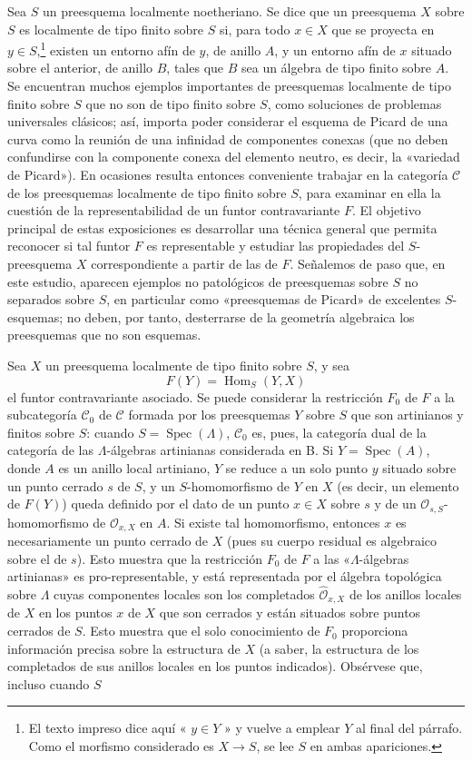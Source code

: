 \documentclass[11pt,twoside,openany]{book}
\numberwithin{equation}{section}
\newcommand{\src}[1]{%
  \phantomsection\hypertarget{src:#1}{}%
  \marginpar{\raggedleft\footnotesize\sffamily #1}%
}
\theoremstyle{plain}
\theoremstyle{definition}
\theoremstyle{remark}
\newcommand{\FgaUnitKey}{frontmatter}
\renewcommand{\src}[1]{%
  \phantomsection\hypertarget{src:\FgaUnitKey:#1}{}%
  \marginpar{\raggedleft\footnotesize\sffamily #1}%
}
\theoremstyle{plain}
\theoremstyle{definition}
\theoremstyle{remark}
\begin{document}
Sea $S$ un preesquema localmente noetheriano. Se dice que un preesquema $X$
sobre $S$ es \src{379}localmente de tipo finito sobre $S$ si, para todo
$x\in X$ que se proyecta en $y\in S$,\footnote{El texto impreso dice aquí
« $y\in Y$ » y vuelve a emplear $Y$ al final del párrafo. Como el morfismo
considerado es $X\longrightarrow S$, se lee $S$ en ambas apariciones.} existen
un entorno afín de $y$, de anillo $A$, y un entorno afín de $x$ situado sobre
el anterior, de anillo $B$, tales que $B$ sea un álgebra de tipo finito sobre
$A$. Se encuentran muchos ejemplos importantes de preesquemas localmente de
tipo finito sobre $S$ que no son de tipo finito sobre $S$, como soluciones de
problemas universales clásicos; así, importa poder considerar el esquema de
Picard de una curva como la reunión de una infinidad de componentes conexas
(que no deben confundirse con la componente conexa del elemento neutro, es
decir, la «variedad de Picard»). En ocasiones resulta entonces conveniente
trabajar en la categoría $\mathcal C$ de los preesquemas localmente de tipo
finito sobre $S$, para examinar en ella la cuestión de la representabilidad de
un funtor contravariante $F$. El objetivo principal de estas exposiciones es
desarrollar una técnica general que permita reconocer si tal funtor $F$ es
representable y estudiar las propiedades del $S$-preesquema $X$ correspondiente
a partir de las de $F$. Señalemos de paso que, en este estudio, aparecen
ejemplos no patológicos de preesquemas sobre $S$ no separados sobre $S$, en
particular como «preesquemas de Picard» de excelentes $S$-esquemas; no deben,
por tanto, desterrarse de la geometría algebraica los preesquemas que no son
esquemas.

Sea $X$ un preesquema localmente de tipo finito sobre $S$, y sea
\[
  F(Y)=\operatorname{Hom}_S(Y,X)
\]
el funtor contravariante asociado. Se puede considerar la restricción $F_0$ de
$F$ a la subcategoría $\mathcal C_0$ de $\mathcal C$ formada por los
preesquemas $Y$ sobre $S$ que son artinianos y finitos sobre $S$: cuando
$S=\operatorname{Spec}(\Lambda)$, $\mathcal C_0$ es, pues, la categoría dual
de la categoría de las $\Lambda$-álgebras artinianas considerada en B. Si
$Y=\operatorname{Spec}(A)$, donde $A$ es un anillo local artiniano, $Y$ se
reduce a un solo punto $y$ situado sobre un punto cerrado $s$ de $S$, y un
$S$-homomorfismo de $Y$ en $X$ (es decir, un elemento de $F(Y)$) queda definido
por el dato de un punto $x\in X$ sobre $s$ y de un
$\mathcal O_{s,S}$-homomorfismo de $\mathcal O_{x,X}$ en $A$. Si existe tal
homomorfismo, entonces $x$ es necesariamente un punto cerrado de $X$ (pues su
cuerpo residual es algebraico sobre el de $s$). Esto muestra que la restricción
$F_0$ de $F$ a las «$\Lambda$-álgebras artinianas» es pro-representable, y está
representada por el álgebra topológica sobre $\Lambda$ cuyas componentes
locales son los completados $\widehat{\mathcal O}_{x,X}$ de los anillos locales
de $X$ en los puntos $x$ de $X$ que son cerrados y están situados sobre puntos
cerrados de $S$. Esto muestra que el solo conocimiento de $F_0$ proporciona
información precisa sobre la estructura de $X$ (a saber, la estructura de los
completados de sus anillos locales en los puntos indicados). Obsérvese que,
incluso cuando $S$
\end{document}
